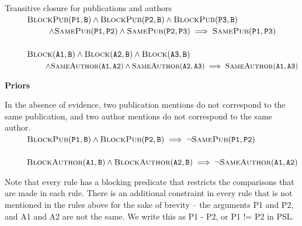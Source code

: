 \documentclass{article}
\begin{document}
                    Transitive closure for publications and authors\\
                    $ ~~~~~~~~\textsc{BlockPub}(\texttt{P1}, \texttt{B}) \wedge \textsc{BlockPub}(\texttt{P2}, \texttt{B})  \wedge \textsc{BlockPub}(\texttt{P3}, \texttt{B}) $ \\
                    $ ~~~~~~~~~~~~~~~~ \wedge  \textsc{SamePub}(\texttt{P1}, \texttt{P2}) \wedge \textsc{SamePub}(\texttt{P2}, \texttt{P3}) 
                    \implies \textsc{SamePub}(\texttt{P1},\texttt{P3}) $\\ \\
                    $ ~~~~~~~~\textsc{Block}(\texttt{A1}, \texttt{B}) \wedge \textsc{Block}(\texttt{A2}, \texttt{B})  \wedge \textsc{Block}(\texttt{A3}, \texttt{B}) $ \\
                    $ ~~~~~~~~~~~~~~~~ \wedge  \textsc{SameAuthor}(\texttt{A1}, \texttt{A2}) \wedge \textsc{SameAuthor}(\texttt{A2}, \texttt{A3}) 
                    \implies \textsc{SameAuthor}(\texttt{A1},\texttt{A3}) $
                    
                \textbf{Priors}
                
                    In the absence of evidence, two publication mentions do not correspond to the same publication, and two author mentions do not correspond to the same author. \\
                    $ ~~~~~~~~\textsc{BlockPub}(\texttt{P1}, \texttt{B})
                      \wedge \textsc{BlockPub}(\texttt{P2}, \texttt{B})
                      \implies \neg{}\textsc{SamePub}(\texttt{P1},\texttt{P2})$\\ \\
                    $ ~~~~~~~~\textsc{BlockAuthor}(\texttt{A1}, \texttt{B})
                      \wedge \textsc{BlockAuthor}(\texttt{A2}, \texttt{B})
                      \implies \neg{}\textsc{SameAuthor}(\texttt{A1},\texttt{A2})$
                
            Note that every rule has a blocking predicate that restricts the comparisons that are made in each rule. There is an additional constraint in every rule that is not mentioned in the rules above for the sake of brevity -- the arguments P1 and P2, and A1 and A2 are not the same. We write this as P1 - P2, or P1 != P2 in PSL.
                
\end{document}
